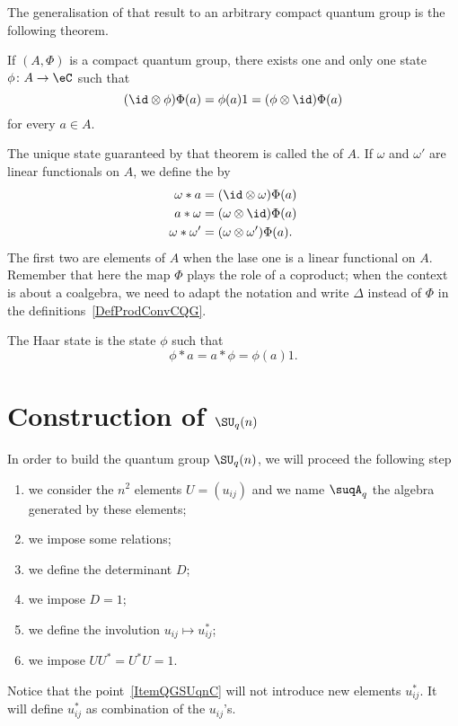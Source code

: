 The generalisation of that result to an arbitrary compact quantum group is the following theorem.
\begin{theorem}
	If $(A,\Phi)$ is a compact quantum group, there exists one and only one state $\phi\colon A\to \eC$ such that
	\begin{equation}
		(\id\otimes\phi)\Phi(a)=\phi(a)1=(\phi\otimes\id)\Phi(a)
	\end{equation}
	for every $a\in A$.
\end{theorem}
The unique state guaranteed by that theorem is called the  of $A$. If $\omega$ and $\omega'$ are linear functionals on $A$, we define the  by
\begin{equation}        \label{DefProdConvCQG}
	\begin{aligned}[]
		\omega * a       & =(\id\otimes\omega)\Phi(a)      \\
		a*\omega         & =(\omega\otimes\id)\Phi(a)      \\
		\omega * \omega' & =(\omega\otimes\omega')\Phi(a).
	\end{aligned}
\end{equation}
The first two are elements of $A$ when the lase one is a linear functional on $A$. Remember that here the map $\Phi$ plays the role of a coproduct; when the context is about a coalgebra, we need to adapt the notation and write $\Delta$ instead of $\Phi$ in the definitions~\ref{DefProdConvCQG}.

The Haar state is the state $\phi$ such that
\begin{equation}
	\phi*a=a*\phi=\phi(a)1.
\end{equation}


\section{Construction of \texorpdfstring{$\SU_q(n)$}{SUqn}}
\label{SecGeneratorsonSUQn}

In order to build the quantum group $\SU_q(n)$, we will proceed the following step\cite{Koelink}
\begin{enumerate}
	\item
	      we consider the $n^2$ elements $U=(u_{ij})$ and we name $\suqA_q$ the algebra generated by these elements;
	\item
	      we impose some relations;
	\item
	      we define the determinant $D$;
	\item
	      we impose $D=1$;
	\item\label{ItemQGSUqnC}
	      we define the involution $u_{ij}\mapsto u_{ij}^*$;
	\item
	      we impose $UU^*=U^*U=1$.

\end{enumerate}
Notice that the point~\ref{ItemQGSUqnC} will not introduce new elements $u_{ij}^*$. It will define $u_{ij}^*$ as combination of the $u_{ij}$'s.

